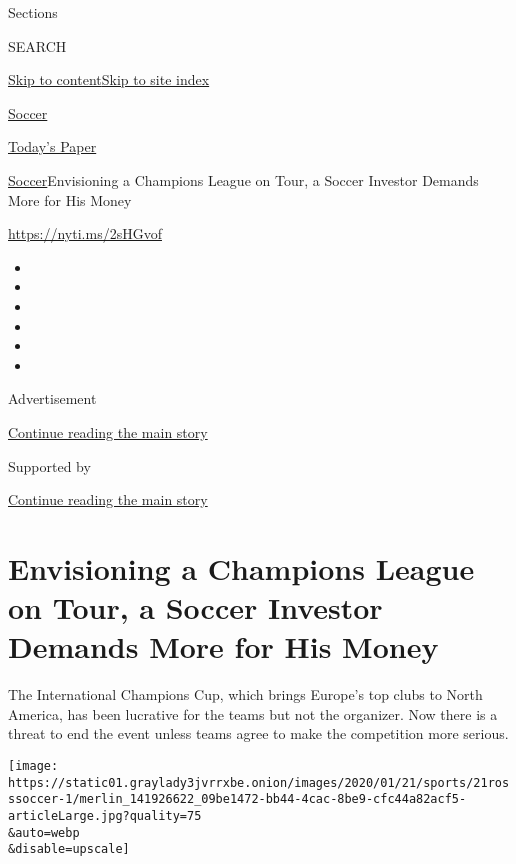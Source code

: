 Sections

SEARCH

\protect\hyperlink{site-content}{Skip to
content}\protect\hyperlink{site-index}{Skip to site index}

\href{https://www.nytimes3xbfgragh.onion/section/sports/soccer}{Soccer}

\href{https://myaccount.nytimes3xbfgragh.onion/auth/login?response_type=cookie\&client_id=vi}{}

\href{https://www.nytimes3xbfgragh.onion/section/todayspaper}{Today's
Paper}

\href{/section/sports/soccer}{Soccer}\textbar{}Envisioning a Champions
League on Tour, a Soccer Investor Demands More for His Money

\url{https://nyti.ms/2sHGvof}

\begin{itemize}
\item
\item
\item
\item
\item
\item
\end{itemize}

Advertisement

\protect\hyperlink{after-top}{Continue reading the main story}

Supported by

\protect\hyperlink{after-sponsor}{Continue reading the main story}

\hypertarget{envisioning-a-champions-league-on-tour-a-soccer-investor-demands-more-for-his-money}{%
\section{Envisioning a Champions League on Tour, a Soccer Investor
Demands More for His
Money}\label{envisioning-a-champions-league-on-tour-a-soccer-investor-demands-more-for-his-money}}

The International Champions Cup, which brings Europe's top clubs to
North America, has been lucrative for the teams but not the organizer.
Now there is a threat to end the event unless teams agree to make the
competition more serious.

\texttt{[image: https://static01.graylady3jvrrxbe.onion/images/2020/01/21/sports/21rosssoccer-1/merlin\_141926622\_09be1472-bb44-4cac-8be9-cfc44a82acf5-articleLarge.jpg?quality=75\\\&auto=webp\\\&disable=upscale]}

